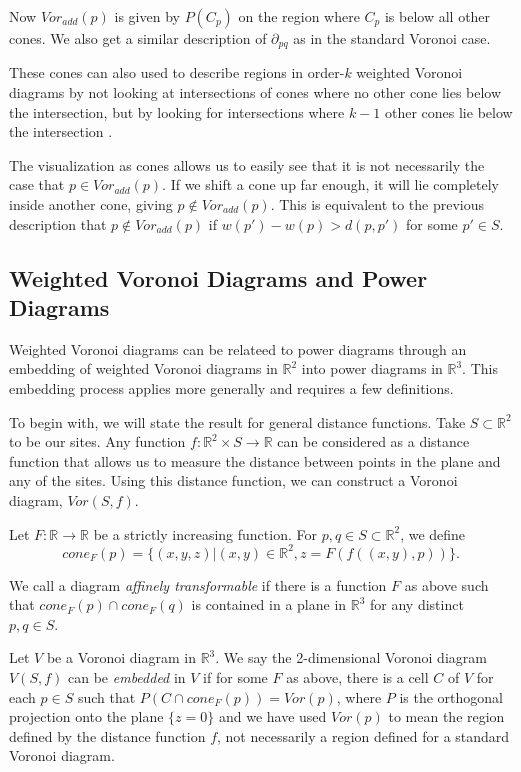 \documentclass[a4paper, 11pt]{article}
\newcommand{\R}{\mathbb{R}}
\begin{document}
Now $Vor_{add}(p)$ is given by $P(C_p)$ on the region where $C_p$ is below all other
cones. We also get a similar description of $\partial_{pq}$ as in the standard Voronoi case.

These cones can also used to describe regions in order-$k$ weighted Voronoi diagrams by not looking at intersections of cones where no other
cone lies below the intersection, but by looking for intersections where $k-1$ other cones lie below the intersection \cite{rosenberger_additive}.

The visualization as cones allows us to easily see that it is not necessarily the case that $p \in Vor_{add}(p)$. If we shift a cone up far enough, it
will lie completely inside another cone, giving $p \notin Vor_{add}(p)$. This is equivalent to the previous description that $p \notin Vor_{add}(p)$
if $w(p') - w(p) > d(p,p')$ for some $p' \in S$.

\subsection{Weighted Voronoi Diagrams and Power Diagrams}

Weighted Voronoi diagrams can be relateed to power diagrams through an embedding of weighted Voronoi diagrams in $\R^2$ into power diagrams in $\R^3$.
This embedding process applies more generally and requires a few definitions.

To begin with, we will state the result for general distance functions. Take $S \subset \R^2$ to be our sites. Any function $f: \R^2 \times S \to \R$
can be considered as a distance function that allows us to measure the distance between points in the plane and any of the sites. Using this distance
function, we can construct a Voronoi diagram, $Vor(S,f)$.

Let $F: \R \to \R$ be a strictly increasing function. For $p,q \in S \subset \R^2$, we define
\[ cone_F(p) = \{ (x,y,z) | (x,y) \in \R^2, z = F( f( (x,y), p) ) \}. \]

We call a diagram \textit{affinely transformable} if there is a function $F$ as above such that $cone_F(p) \cap cone_F(q)$ is contained in a plane in $\R^3$ for any distinct
$p,q \in S$.

Let $V$ be a Voronoi diagram in $\R^3$. We say the 2-dimensional Voronoi diagram $V(S,f)$ can be \textit{embedded} in $V$ if for some $F$ as above,
there is a cell $C$ of $V$ for each $p \in S$ such that $P( C \cap cone_F(p)) = Vor(p)$, where $P$ is the orthogonal projection onto the plane $\{ z =
0 \}$ and we have used $Vor(p)$ to mean the region defined
by the distance function $f$, not necessarily a region defined for a standard Voronoi diagram.
\end{document}
